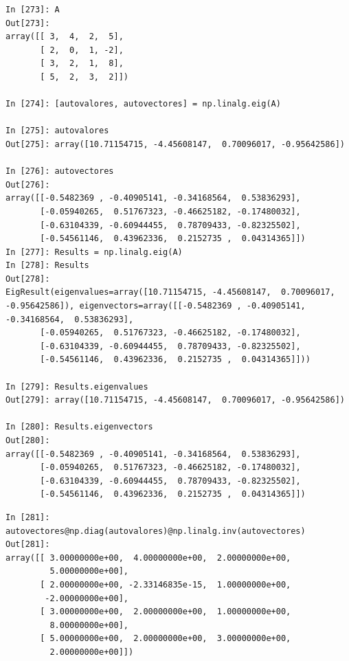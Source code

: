\begin{center}
    \begin{minipage}{\textwidth}
    \begin{verbatim}
In [273]: A
Out[273]: 
array([[ 3,  4,  2,  5],
       [ 2,  0,  1, -2],
       [ 3,  2,  1,  8],
       [ 5,  2,  3,  2]])

In [274]: [autovalores, autovectores] = np.linalg.eig(A)

In [275]: autovalores
Out[275]: array([10.71154715, -4.45608147,  0.70096017, -0.95642586])

In [276]: autovectores
Out[276]: 
array([[-0.5482369 , -0.40905141, -0.34168564,  0.53836293],
       [-0.05940265,  0.51767323, -0.46625182, -0.17480032],
       [-0.63104339, -0.60944455,  0.78709433, -0.82325502],
       [-0.54561146,  0.43962336,  0.2152735 ,  0.04314365]])
In [277]: Results = np.linalg.eig(A)
In [278]: Results
Out[278]: 
EigResult(eigenvalues=array([10.71154715, -4.45608147,  0.70096017,
-0.95642586]), eigenvectors=array([[-0.5482369 , -0.40905141, -0.34168564,  0.53836293],
       [-0.05940265,  0.51767323, -0.46625182, -0.17480032],
       [-0.63104339, -0.60944455,  0.78709433, -0.82325502],
       [-0.54561146,  0.43962336,  0.2152735 ,  0.04314365]]))

In [279]: Results.eigenvalues
Out[279]: array([10.71154715, -4.45608147,  0.70096017, -0.95642586])

In [280]: Results.eigenvectors
Out[280]: 
array([[-0.5482369 , -0.40905141, -0.34168564,  0.53836293],
       [-0.05940265,  0.51767323, -0.46625182, -0.17480032],
       [-0.63104339, -0.60944455,  0.78709433, -0.82325502],
       [-0.54561146,  0.43962336,  0.2152735 ,  0.04314365]])
\end{verbatim}
\end{minipage}
\end{center}

\begin{center}
\begin{minipage}{\textwidth}
\begin{verbatim}
In [281]: autovectores@np.diag(autovalores)@np.linalg.inv(autovectores)
Out[281]: 
array([[ 3.00000000e+00,  4.00000000e+00,  2.00000000e+00,
         5.00000000e+00],
       [ 2.00000000e+00, -2.33146835e-15,  1.00000000e+00,
        -2.00000000e+00],
       [ 3.00000000e+00,  2.00000000e+00,  1.00000000e+00,
         8.00000000e+00],
       [ 5.00000000e+00,  2.00000000e+00,  3.00000000e+00,
         2.00000000e+00]])

    \end{verbatim}    
    \end{minipage}
\end{center}


